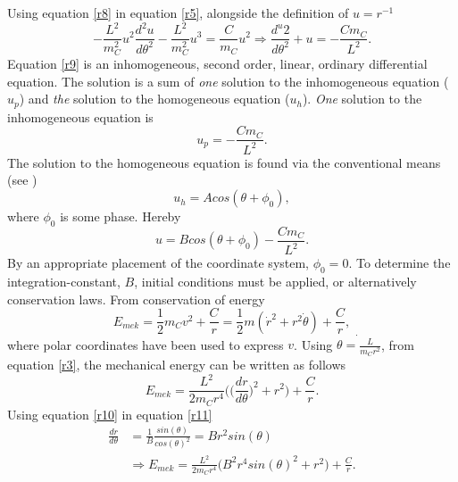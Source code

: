 \begin{example}
\begin{enumerate}
		Using equation \eqref{r8} in equation \eqref{r5}, alongside the definition of $u=r^{-1}$
		\begin{equation}
			-\frac{L^2}{m_C^2}u^2\frac{d^2u}{d\theta^2}-\frac{L^2}{m_C^2}u^3=\frac{C}{m_C}u^2\Rightarrow \frac{d^u2}{d\theta^2}+u=-\frac{Cm_C}{L^2}.
			\label{r9}
		\end{equation} 
		Equation \eqref{r9} is an inhomogeneous, second order, linear, ordinary differential equation. The solution is a sum of \emph{one} solution to the inhomogeneous equation ($u_p$) and \emph{the} solution to the homogeneous equation ($u_h$). \emph{One} solution to the inhomogeneous equation is
		\begin{equation}
			u_p=-\frac{Cm_C}{L^2}.
		\end{equation} 
		The solution to the homogeneous equation is found via the conventional means (see \citealt{calculus})
		\begin{equation}
			u_h=Acos(\theta+\phi_0),
		\end{equation} 
		where $\phi_0$ is some phase. Hereby	
		\begin{equation}
			u=Bcos(\theta+\phi_0)-\frac{Cm_C}{L^2}.
			\label{r10}
		\end{equation} 
		By an appropriate placement of the coordinate system, $\phi_0=0$. To determine the integration-constant, $B$, initial conditions must be applied, or alternatively conservation laws. From conservation of energy
		\begin{equation}
			E_{mek}=\frac{1}{2}m_Cv^2+\frac{C}{r}=\frac{1}{2}m(\dot{r}^2+r^2\dot{\theta})+\frac{C}{r},
		\end{equation} 
		where polar coordinates have been used to express $v$. Using $\dot{\theta=\frac{L}{m_Cr^2}}$, from equation \eqref{r3}, the mechanical energy can be written as follows
		\begin{equation}
			E_{mek}=\frac{L^2}{2m_Cr^4}\bigg(\bigg(\frac{dr}{d\theta}\bigg)^2+r^2\bigg)+\frac{C}{r}.
			\label{r11}
		\end{equation} 
		Using equation \eqref{r10} in equation \eqref{r11}
		\begin{equation}
			\begin{split}
				\frac{dr}{d\theta}&=\frac{1}{B}\frac{sin(\theta)}{cos(\theta)^2}=Br^2sin(\theta)\\
				&\Rightarrow E_{mek}=\frac{L^2}{2m_Cr^4}\bigg(B^2r^4sin(\theta)^2+r^2\bigg)+\frac{C}{r}.\\
			\end{split}
			\label{r12}
		\end{equation} 		

\end{enumerate}
\end{example}
